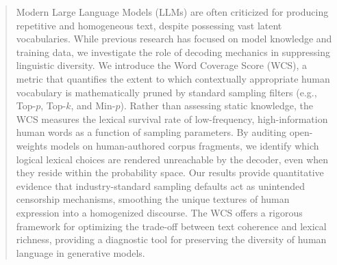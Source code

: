 \documentclass{article}
\begin{document}
\maketitle
\begin{abstract}
Modern Large Language Models (LLMs) are often criticized for producing repetitive and homogeneous text, despite possessing vast latent vocabularies. While previous research has focused on model knowledge and training data, we investigate the role of decoding mechanics in suppressing linguistic diversity. We introduce the Word Coverage Score (WCS), a metric that quantifies the extent to which contextually appropriate human vocabulary is mathematically pruned by standard sampling filters (e.g., Top-$p$, Top-$k$, and Min-$p$). Rather than assessing static knowledge, the WCS measures the lexical survival rate of low-frequency, high-information human words as a function of sampling parameters. By auditing open-weights models on human-authored corpus fragments, we identify which logical lexical choices are rendered unreachable by the decoder, even when they reside within the probability space. Our results provide quantitative evidence that industry-standard sampling defaults act as unintended censorship mechanisms, smoothing the unique textures of human expression into a homogenized discourse. The WCS offers a rigorous framework for optimizing the trade-off between text coherence and lexical richness, providing a diagnostic tool for preserving the diversity of human language in generative models.



\end{abstract}
\end{document}
